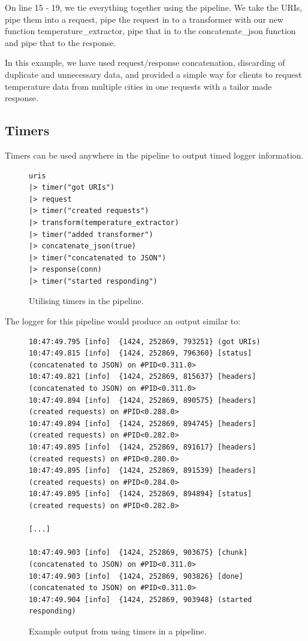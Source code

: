 \documentclass{cslthse-msc}
\begin{document}
On line 15 - 19, we tie everything together using the pipeline. We take the URIs, pipe them into a request, pipe the request in to a transformer with our new function temperature\_extractor, pipe that in to the concatenate\_json function and pipe that to the response.

In this example, we have used request/response concatenation, discarding of duplicate and unnecessary data, and provided a simple way for clients to request temperature data from multiple cities in one requests with a tailor made response.

\subsection{Timers}
Timers can be used anywhere in the pipeline to output timed logger information.

\begin{figure}[H]
  \centering
\begin{lstlisting}[breaklines=true,frame=single]
uris
|> timer("got URIs")
|> request
|> timer("created requests")
|> transform(temperature_extractor)
|> timer("added transformer")
|> concatenate_json(true)
|> timer("concatenated to JSON")
|> response(conn)
|> timer("started responding")
\end{lstlisting}
  \caption{Utilising timers in the pipeline.}
\end{figure}

The logger for this pipeline would produce an output similar to:

\begin{figure}[H]
  \centering
\begin{lstlisting}[breaklines=true,frame=single]
10:47:49.795 [info]  {1424, 252869, 793251} (got URIs)
10:47:49.815 [info]  {1424, 252869, 796360} [status] (concatenated to JSON) on #PID<0.311.0>
10:47:49.821 [info]  {1424, 252869, 815637} [headers] (concatenated to JSON) on #PID<0.311.0>
10:47:49.894 [info]  {1424, 252869, 890575} [headers] (created requests) on #PID<0.288.0>
10:47:49.894 [info]  {1424, 252869, 894745} [headers] (created requests) on #PID<0.282.0>
10:47:49.895 [info]  {1424, 252869, 891617} [headers] (created requests) on #PID<0.280.0>
10:47:49.895 [info]  {1424, 252869, 891539} [headers] (created requests) on #PID<0.284.0>
10:47:49.895 [info]  {1424, 252869, 894894} [status] (created requests) on #PID<0.282.0>

[...]

10:47:49.903 [info]  {1424, 252869, 903675} [chunk] (concatenated to JSON) on #PID<0.311.0>
10:47:49.903 [info]  {1424, 252869, 903826} [done] (concatenated to JSON) on #PID<0.311.0>
10:47:49.904 [info]  {1424, 252869, 903948} (started responding)
\end{lstlisting}
  \caption{Example output from using timers in a pipeline.}
\end{figure}
\end{document}
